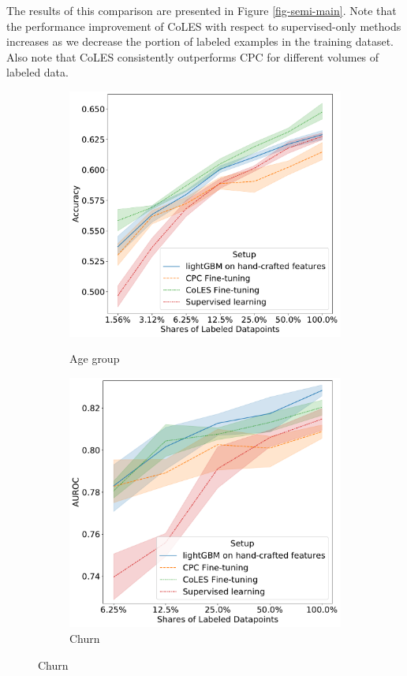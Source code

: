 \documentclass[sigconf, anonymous]{acmart}
\begin{document}
The results of this comparison are presented in Figure \ref{fig-semi-main}. Note that the performance improvement of CoLES with respect to supervised-only methods increases as we decrease the portion of labeled examples in the training dataset. Also note that CoLES consistently outperforms CPC for different volumes of labeled data.

\begin{figure}
  \centering
  \begin{subfigure}{0.25\linewidth}
    \caption{Age group}
    \includegraphics[width=\linewidth]{figures/ss_age_pred_per.pdf}
    \label{fig-semi-age2}
  \end{subfigure}%
  \begin{subfigure}{0.25\linewidth}
    \caption{Churn}
    \includegraphics[width=\linewidth]{figures/ss_rosbank_per.pdf}

\end{subfigure}
\end{figure}
\end{document}
